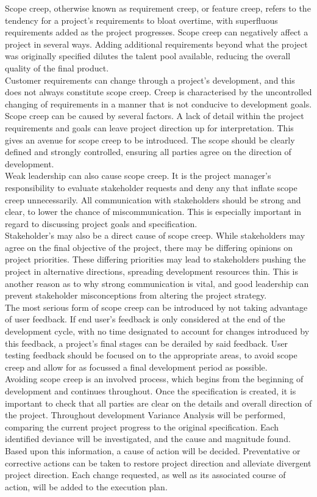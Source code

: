 \documentclass [12pt]{article}
\begin{document}
Scope creep, otherwise known as requirement creep, or feature creep, refers to the tendency for a project’s requirements to bloat overtime, with superfluous requirements added as the project progresses. Scope creep can negatively affect a project in several ways. Adding additional requirements beyond what the project was originally specified dilutes the talent pool available, reducing the overall quality of the final product.
\\
Customer requirements can change through a project’s development, and this does not always constitute scope creep. Creep is characterised by the uncontrolled changing of requirements in a manner that is not conducive to development goals.
Scope creep can be caused by several factors. A lack of detail within the project requirements and goals can leave project direction up for interpretation. This gives an avenue for scope creep to be introduced. The scope should be clearly defined and strongly controlled, ensuring all parties agree on the direction of development.
\\
Weak leadership can also cause scope creep. It is the project manager’s responsibility to evaluate stakeholder requests and deny any that inflate scope creep unnecessarily. All communication with stakeholders should be strong and clear, to lower the chance of miscommunication. This is especially important in regard to discussing project goals and specification.
\\
Stakeholder’s may also be a direct cause of scope creep. While stakeholders may agree on the final objective of the project, there may be differing opinions on project priorities. These differing priorities may lead to stakeholders pushing the project in alternative directions, spreading development resources thin. This is another reason as to why strong communication is vital, and good leadership can prevent stakeholder misconceptions from altering the project strategy.
\\
The most serious form of scope creep can be introduced by not taking advantage of user feedback. If end user’s feedback is only considered at the end of the development cycle, with no time designated to account for changes introduced by this feedback, a project’s final stages can be derailed by said feedback. User testing feedback should be focused on to the appropriate areas, to avoid scope creep and allow for as focussed a final development period as possible.
\\
Avoiding scope creep is an involved process, which begins from the beginning of development and continues throughout. Once the specification is created, it is important to check that all parties are clear on the details and overall direction of the project. Throughout development Variance Analysis will be performed, comparing the current project progress to the original specification. Each identified deviance will be investigated, and the cause and magnitude found. Based upon this information, a cause of action will be decided. Preventative or corrective actions can be taken to restore project direction and alleviate divergent project direction. Each change requested, as well as its associated course of action, will be added to the execution plan.
\end{document}
